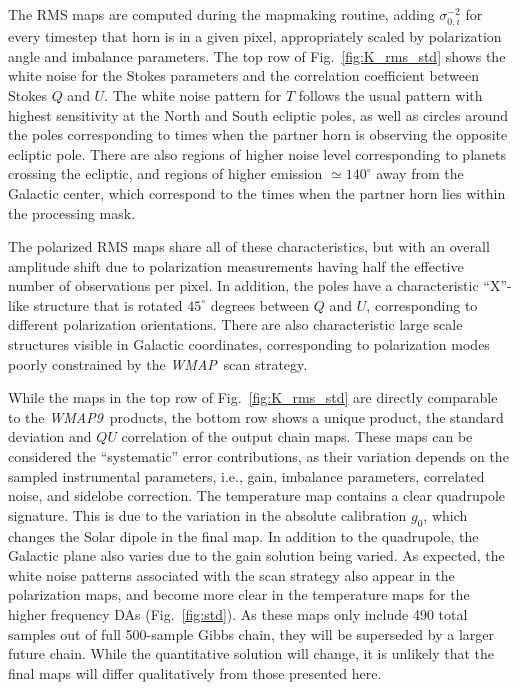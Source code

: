 \documentclass[twocolumn]{../../common/aa}
\def\WMAP{\emph{WMAP}}
\def\WMAPnine{\emph{WMAP9}}
\begin{document}
The RMS maps are computed during the mapmaking routine, adding $\sigma_{0,i}^{-2}$ for every timestep that horn is in a given pixel, appropriately scaled by polarization angle and imbalance parameters. The top row of Fig.~\ref{fig:K_rms_std} shows the white noise for the Stokes parameters and the correlation coefficient between Stokes $Q$ and $U$. The white noise pattern for $T$ follows the usual pattern with highest sensitivity at the North and South ecliptic poles, as well as circles around the poles corresponding to times when the partner horn is observing the opposite ecliptic pole. There are also regions of higher noise level corresponding to planets crossing the ecliptic, and regions of higher emission $\simeq140^\circ$ away from the Galactic center, which correspond to the times when the partner horn lies within the processing mask.

The polarized RMS maps share all of these characteristics, but with an overall amplitude shift due to polarization measurements having half the effective number of observations per pixel. In addition, the poles have a characteristic ``X''-like structure that is rotated $45^\circ$ degrees between $Q$ and $U$, corresponding to different polarization orientations. There are also characteristic large scale structures visible in Galactic coordinates, corresponding to polarization modes poorly constrained by the \WMAP\ scan strategy.

While the maps in the top row of Fig.~\ref{fig:K_rms_std} are directly comparable to the \WMAPnine\ products, the bottom row shows a unique product, the standard deviation and $QU$ correlation of the output chain maps. These maps can be considered the ``systematic'' error contributions, as their variation depends on the sampled instrumental parameters, i.e., gain, imbalance parameters, correlated noise, and sidelobe correction. The temperature map contains a clear quadrupole signature. This is due to the variation in the absolute calibration $g_0$, which changes the Solar dipole in the final map. In addition to the quadrupole, the Galactic plane also varies due to the gain solution being varied. As expected, the white noise patterns associated with the scan strategy also appear in the polarization maps, and become more clear in the temperature maps for the higher frequency DAs (Fig.~\ref{fig:std}).
As these maps only include 490 total samples out of full 500-sample Gibbs chain, they will be superseded by a larger future chain. While the quantitative solution will change, it is unlikely that the final maps will differ qualitatively from those presented here.
\end{document}
